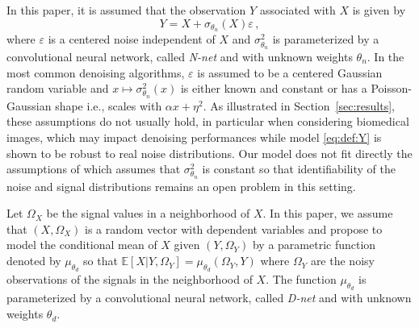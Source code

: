 \documentclass{article}
\begin{document}
In this paper, it is assumed that the observation $Y$ associated with $X$  is given by
\begin{equation}
\label{eq:def:Y}
Y = X + \sigma_{\theta_n}(X)\varepsilon\,,
\end{equation}
where $\varepsilon$ is a centered noise independent of $X$ and $\sigma^2_{\theta_n}$ is parameterized by a convolutional neural network, called \textit{N-net} and with unknown weights $\theta_n$.
In the most common denoising algorithms,  $\varepsilon$ is assumed to be a centered Gaussian random variable and  $x\mapsto \sigma^2_{\theta_n}(x)$ is either known and constant or has a Poisson-Gaussian shape i.e., scales with $\alpha x + \eta^2$. As illustrated in Section~\ref{sec:results}, these assumptions do not usually hold, in particular when considering biomedical images, which may impact denoising performances while  model \eqref{eq:def:Y} is shown to be robust to real noise distributions.
Our model does not fit directly the assumptions of \cite{gassiat:lecorff:lehericy:2021} which assumes that $\sigma^2_{\theta_n}$ is constant so that  identifiability of the noise and signal  distributions remains an open problem in this setting.

Let  $\Omega_X$ be the signal values in a neighborhood of $X$.
In this paper, we assume that $(X,\Omega_X)$ is a random vector with dependent variables and propose to model the conditional mean of $X$ given $(Y,\Omega_Y)$ by a parametric function denoted by $\mu_{\theta_d}$ so that $\mathbb{E}[X|Y,\Omega_Y] = \mu_{\theta_d}(\Omega_Y,Y)$ where $\Omega_Y$ are the noisy observations of the signals in the neighborhood of $X$. The function $ \mu_{\theta_d}$ is parameterized by a convolutional neural network, called \textit{D-net} and with unknown weights $\theta_d$.
\end{document}
